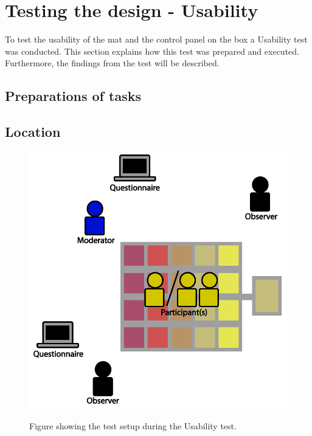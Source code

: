 



\section{Testing the design - Usability}
To test the usability of the mat and the control panel on the box a Usability test was conducted. This section explains how this test was prepared and executed. Furthermore, the findings from the test will be described.

\subsection{Preparations of tasks}

\subsection{Location}
\begin{figure}[H]
	\centering
	\includegraphics[width=0.7\linewidth]{figure/Design/usability}
	\label{fig:usabilityTest}
	\caption{Figure showing the test setup during the Usability test.}	
\end{figure}

